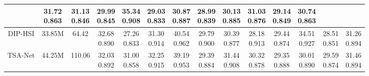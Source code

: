 \documentclass{article}
\begin{document}
\begin{table*}[t]
{\begin{tabular}{cccccccccccccc}
			&\tabincell{c}{31.72\\0.863}
			&\tabincell{c}{31.13\\0.846}
			&\tabincell{c}{29.99\\0.845}
			&\tabincell{c}{35.34\\0.908}
			&\tabincell{c}{29.03\\0.833}
			&\tabincell{c}{30.87\\0.887}
			&\tabincell{c}{28.99\\0.839}
			&\tabincell{c}{30.13\\0.885}
			&\tabincell{c}{31.03\\0.876}
			&\tabincell{c}{29.14\\0.849}
			&\tabincell{c}{30.74\\0.863}
			\\
			\midrule
			DIP-HSI \cite{self}
			& 33.85M
			& 64.42
			&\tabincell{c}{32.68\\0.890}
			&\tabincell{c}{27.26\\0.833}
			&\tabincell{c}{31.30\\0.914}
			&\tabincell{c}{40.54\\0.962}
			&\tabincell{c}{29.79\\0.900}
			&\tabincell{c}{30.39\\0.877}
			&\tabincell{c}{28.18\\0.913}
			&\tabincell{c}{29.44\\0.874}
			&\tabincell{c}{34.51\\0.927}
			&\tabincell{c}{28.51\\0.851}
			&\tabincell{c}{31.26\\0.894}
			\\
			\midrule
			TSA-Net \cite{tsa_net}
			& 44.25M
			& 110.06
			&\tabincell{c}{32.03\\0.892}
			&\tabincell{c}{31.00\\0.858}
			&\tabincell{c}{32.25\\0.915}
			&\tabincell{c}{39.19\\0.953}
			&\tabincell{c}{29.39\\0.884}
			&\tabincell{c}{31.44\\0.908}
			&\tabincell{c}{30.32\\0.878}
			&\tabincell{c}{29.35\\0.888}
			&\tabincell{c}{30.01\\0.890}
			&\tabincell{c}{29.59\\0.874}
			&\tabincell{c}{31.46\\0.894}
			\\

\end{tabular}}
\end{table*}
\end{document}
